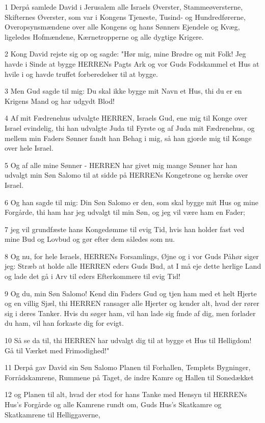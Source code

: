 \par 1 Derpå samlede David i Jerusalem alle Israels Øverster, Stammeøversterne, Skifternes Øverster, som var i Kongens Tjeneste, Tusind- og Hundredførerne, Overopsynsmændene over alle Kongens og hans Sønners Ejendele og Kvæg, ligeledes Hofmændene, Kærnetropperne og alle dygtige Krigere.
\par 2 Kong David rejste sig op og sagde: "Hør mig, mine Brødre og mit Folk! Jeg havde i Sinde at bygge HERRENs Pagts Ark og vor Guds Fodskammel et Hus at hvile i og havde truffet forberedelser til at bygge.
\par 3 Men Gud sagde til mig: Du skal ikke bygge mit Navn et Hus, thi du er en Krigens Mand og har udgydt Blod!
\par 4 Af mit Fædrenehus udvalgte HERREN, Israels Gud, ene mig til Konge over Israel evindelig, thi han udvalgte Juda til Fyrste og af Juda mit Fædrenehus, og mellem min Faders Sønner fandt han Behag i mig, så han gjorde mig til Konge over hele Israel.
\par 5 Og af alle mine Sønner - HERREN har givet mig mange Sønner har han udvalgt min Søn Salomo til at sidde på HERRENs Kongetrone og herske over Israel.
\par 6 Og han sagde til mig: Din Søn Salomo er den, som skal bygge mit Hus og mine Forgårde, thi ham har jeg udvalgt til min Søn, og jeg vil være ham en Fader;
\par 7 jeg vil grundfæste hans Kongedømme til evig Tid, hvis han holder fast ved mine Bud og Lovbud og gør efter dem således som nu.
\par 8 Og nu, for hele Israels, HERRENs Forsamlings, Øjne og i vor Guds Påhør siger jeg: Stræb at holde alle HERREN eders Guds Bud, at I må eje dette herlige Land og lade det gå i Arv til eders Efterkommere til evig Tid!
\par 9 Og du, min Søn Salomo! Kend din Faders Gud og tjen ham med et helt Hjerte og en villig Sjæl, thi HERREN ransager alle Hjerter og kender alt, hvad der rører sig i deres Tanker. Hvis du søger ham, vil han lade sig fmde af dig, men forlader du ham, vil han forkaste dig for evigt.
\par 10 Så se da til, thi HERREN har udvalgt dig til at bygge et Hus til Helligdom! Gå til Værket med Frimodighed!"
\par 11 Derpå gav David sin Søn Salomo Planen til Forhallen, Templets Bygninger, Forrådskamrene, Rummene på Taget, de indre Kamre og Hallen til Sonedækket
\par 12 og Planen til alt, hvad der stod for hans Tanke med Hensyn til HERRENs Hus's Forgårde og alle Kamrene rundt om, Guds Hus's Skatkamre og Skatkamrene til Helliggaverne,
